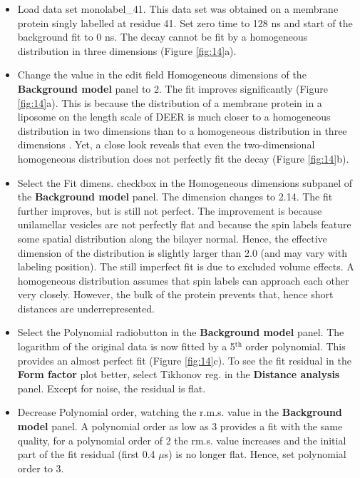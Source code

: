 \documentclass[11pt,a4paper]{article}
\begin{document}
\begin{itemize}
	\item Load data set {\ttfamily monolabel\_41}. This data set was obtained on a membrane protein singly labelled at residue 41. Set zero time to 128 ns and start of the background fit to 0 ns. The decay cannot be fit by a homogeneous distribution in three dimensions (Figure \ref{fig:14}a).
	\item Change the value in the edit field {\ttfamily Homogeneous dimensions} of the {\ttfamily \bf Background model} panel to 2. The fit improves significantly (Figure \ref{fig:14}a). This is because the distribution of a membrane protein in a liposome on the length scale of DEER is much closer to a homogeneous distribution in two dimensions than to a homogeneous distribution in three dimensions \cite{hilger2005}. Yet, a close look reveals that even the two-dimensional homogeneous distribution does not perfectly fit the decay (Figure \ref{fig:14}b).
	\item Select the {\ttfamily Fit dimens. checkbox} in the {\ttfamily Homogeneous dimensions} subpanel of the {\ttfamily \bf Background model} panel. The dimension changes to 2.14. The fit further improves, but is still not perfect. The improvement is because unilamellar vesicles are not perfectly flat and because the spin labels feature some spatial distribution along the bilayer normal. Hence, the effective dimension of the distribution is slightly larger than 2.0 (and may vary with labeling position). The still imperfect fit is due to excluded volume effects. A homogeneous distribution assumes that spin labels can approach each other very closely. However, the bulk of the protein prevents that, hence short distances are underrepresented.	
	\item Select the {\ttfamily Polynomial} radiobutton in the {\ttfamily \bf Background model} panel. The logarithm of the original data is now fitted by a 5$^\mathrm{th}$ order polynomial. This provides an almost perfect fit (Figure \ref{fig:14}c). To see the fit residual in the {\ttfamily \bf Form factor} plot better, select {\ttfamily Tikhonov reg.} in the {\ttfamily \bf Distance analysis} panel. Except for noise, the residual is flat.
	\item Decrease {\ttfamily Polynomial order}, watching the {\ttfamily r.m.s. value} in the {\ttfamily \bf Background model} panel. A polynomial order as low as 3 provides a fit with the same quality, for a polynomial order of 2 the rm.s. value increases and the initial part of the fit residual (first 0.4 $\mu$s) is no longer flat. Hence, set polynomial order to 3.  

\end{itemize}
\end{document}
